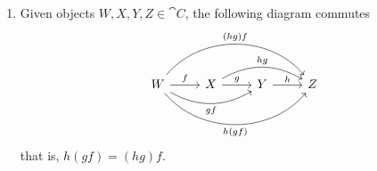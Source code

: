 \begin{definition}[Category]
\begin{enumerate}[(C1)]
        \item Given objects \(W, X, Y, Z \in \cat C\), the following diagram commutes
              \[
                  \begin{tikzcd}
                      W
                      \ar[r, "f"]
                      \ar[rr, bend right, swap, "g  f"]
                      \ar[rrr, bend right = 50, swap, "h  (g  f)"]
                      \ar[rrr, bend left = 50, "(h  g)  f"]
                      &X
                      \ar[r, "g"] \ar[rr, bend left, "h  g"]
                      &Y
                      \ar[r, "h"]
                      &Z
                  \end{tikzcd}
              \]
              that is, \(h  (g  f) = (h  g)  f\).
    \end{enumerate}
\end{definition}

